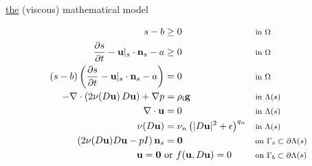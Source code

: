 \documentclass[10pt,dvipsnames]{beamer}
\newcommand{\bg}{\mathbf{g}}
\newcommand{\bn}{\mathbf{n}}
\newcommand{\bu}{\mathbf{u}}
\newcommand{\bzero}{\bm{0}}
\newcommand{\eps}{\epsilon}
\newcommand{\rhoi}{\rho_{\text{i}}}
\begin{document}
\newcommand{\where}[1]{\text{\footnotesize #1}}

\begin{frame}{\underline{the} (viscous) mathematical model}

\begin{align*}
s - b &\ge 0 & &\where{in $\Omega$} \\
\frac{\partial s}{\partial t} - \bu|_s \cdot \bn_s - a &\ge 0 & &\where{in $\Omega$} \\
(s - b) \left(\frac{\partial s}{\partial t} - \bu|_s \cdot \bn_s - a\right) &= 0 & &\where{in $\Omega$} \\
- \nabla \cdot \left(2 \nu(D\bu)\, D\bu\right) + \nabla p &= \rhoi \bg && \where{in $\Lambda(s)$} \\
\nabla \cdot \bu &= 0 && \where{in $\Lambda(s)$} \\
\nu(D\bu) &= \nu_n \left(|D\bu|^2 + \eps\right)^{q_n} && \where{in $\Lambda(s)$} \\
\left(2 \nu(D\bu) D\bu - pI\right) \bn_s &= \bzero && \where{on $\Gamma_s \subset \partial\Lambda(s)$} \\
\bu  = \bzero \text{ } &\text{or } f(\bu,D\bu)=0 && \where{on $\Gamma_b \subset \partial\Lambda(s)$}
\end{align*}
\end{frame}


\newcommand{\viewin}[1]{{\footnotesize \emph{this view appears in} #1}}
\end{document}
